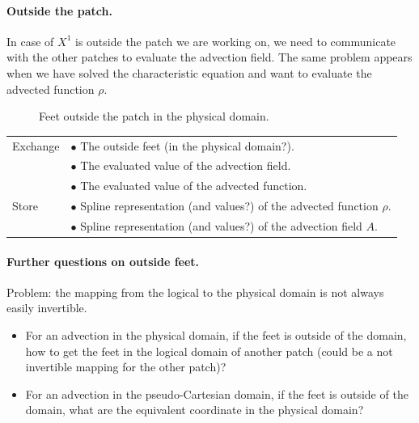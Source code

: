 \documentclass[presentation.tex]{subfiles}
\begin{document}
\paragraph{Outside the patch.}
In case of $X^1$ is outside the patch we are working on, we need to communicate with the other patches to evaluate the advection field. 
The same problem appears when we have solved the characteristic equation and want to evaluate the advected function $\rho$. 


\begin{figure}[!h]
\centering
{}
\caption{Feet outside the patch in the physical domain.}
\end{figure}

\begin{center}
\begin{tabular}{ |l|l| } 
 \hline
 Exchange 	&  $\bullet$ The outside feet (in the physical domain?). \\
 			&  $\bullet$ The evaluated value of the advection field. \\
 			&  $\bullet$ The evaluated value of the advected function. \\

 \hline
 Store 	& $\bullet$ Spline representation (and values?) of the advected function $\rho$. \\
 		& $\bullet$ Spline representation (and values?) of the advection field $A$. \\
 \hline
\end{tabular}
\end{center}

\paragraph{Further questions on outside feet.}
Problem: the mapping from the logical to the physical domain is not always easily invertible. 

\begin{itemize}
	\item For an advection in the physical domain, if the feet is outside of the domain, how to get the feet in the logical domain of another patch (could be a not invertible mapping for the other patch)?
	\item For an advection in the pseudo-Cartesian domain, if the feet is outside of the domain, what are the equivalent coordinate in the physical domain? 
\end{itemize}
\end{document}
